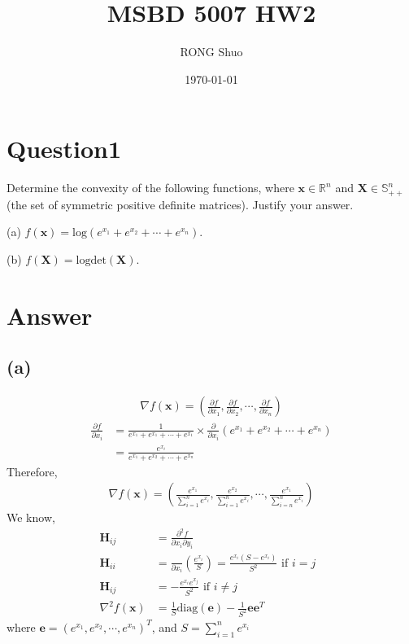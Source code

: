 \documentclass{article}
\title{MSBD 5007 HW2}
\author{RONG Shuo}
\date{\today}
\newcommand{\R}{\mathbb{R}}
\begin{document}
\maketitle

\section*{Question1}
Determine the convexity of the following functions, where \(\bm{x} \in \R^n \) and \(\bm{X} \in \mathbb{S}_{++}^{n}\)(the set of symmetric positive definite matrices). Justify your answer.

(a) \(f(\bm{x}) = \text{log}(e^{x_1} + e^{x_2} + \cdots + e^{x_n})\).

(b) \(f(\bm{X}) = \text{log} \text{det}(\bm{X})\).

\section*{Answer}
\subsection*{(a)}
\begin{align*}
    \nabla f(\bm{x}) = (\frac{\partial f}{\partial x_1}, \frac{\partial f}{\partial x_2}, \cdots, \frac{\partial f}{\partial x_n})
\end{align*}
\begin{align*}
    \frac{\partial f}{\partial x_i} &= \frac{1}{e^{x_1} + e^{x_1} + \cdots + e^{x_1}} \times \frac{\partial }{\partial x_i} (e^{x_1} + e^{x_2} + \cdots + e^{x_n}) \\
    &=  \frac{e^{x_i}}{e^{x_1} + e^{x_2} + \cdots + e^{x_n}} 
\end{align*}
Therefore,
\begin{align*}
    \nabla f(\bm{x}) = (\frac{e^{x_1}}{\sum_{i = 1}^{n} e^{x_i}}, \frac{e^{x_2}}{\sum_{i = 1}^{n} e^{x_i}}, \cdots ,\frac{e^{x_1}}{\sum_{i = n}^{n} e^{x_i}})
\end{align*}
We know,
\begin{align*}
    \bm{H}_{ij} &= \frac{\partial^2 f}{\partial x_i \partial y_i} \\
    \bm{H}_{ii} &= \frac{}{\partial x_i} (\frac{e^{x_i}}{S}) = \frac{e^{x_i} (S - e^{x_i})}{S^2} \text{    if \(i = j\) } \\ 
    \bm{H}_{ij} &= -\frac{e^{x_i}e^{x_j}}{S^2} \text{    if \(i \neq j\) } \\
    \nabla^2 f(\bm{x}) &= \frac{1}{S}\text{diag}(\bm{e}) - \frac{1}{S^2}\bm{e}\bm{e}^T
\end{align*}
where \( \bm{e} = (e^{x_1},  e^{x_2}, \cdots, e^{x_n} )^T \), and \(S = \sum_{i = 1}^{n} e^{x_i}\)
\end{document}
